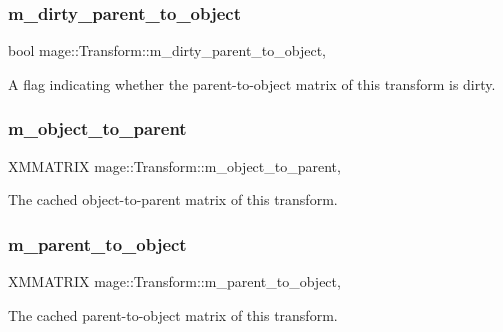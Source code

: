 \subsubsection{\texorpdfstring{m\+\_\+dirty\+\_\+parent\+\_\+to\+\_\+object}{m\_dirty\_parent\_to\_object}}
{\footnotesize\ttfamily bool mage\+::\+Transform\+::m\+\_\+dirty\+\_\+parent\+\_\+to\+\_\+object\hspace{0.3cm}{\ttfamily [mutable]}, {\ttfamily [private]}}

A flag indicating whether the parent-\/to-\/object matrix of this transform is dirty. \hypertarget{structmage_1_1_transform_ad21d0547b1648f22f6b28db044b1d4bd}{}\label{structmage_1_1_transform_ad21d0547b1648f22f6b28db044b1d4bd} 
\subsubsection{\texorpdfstring{m\+\_\+object\+\_\+to\+\_\+parent}{m\_object\_to\_parent}}
{\footnotesize\ttfamily X\+M\+M\+A\+T\+R\+IX mage\+::\+Transform\+::m\+\_\+object\+\_\+to\+\_\+parent\hspace{0.3cm}{\ttfamily [mutable]}, {\ttfamily [private]}}

The cached object-\/to-\/parent matrix of this transform. \hypertarget{structmage_1_1_transform_a4ca7fe2fe7ec7e09cda91e6af63f07f9}{}\label{structmage_1_1_transform_a4ca7fe2fe7ec7e09cda91e6af63f07f9} 
\subsubsection{\texorpdfstring{m\+\_\+parent\+\_\+to\+\_\+object}{m\_parent\_to\_object}}
{\footnotesize\ttfamily X\+M\+M\+A\+T\+R\+IX mage\+::\+Transform\+::m\+\_\+parent\+\_\+to\+\_\+object\hspace{0.3cm}{\ttfamily [mutable]}, {\ttfamily [private]}}

The cached parent-\/to-\/object matrix of this transform. \hypertarget{structmage_1_1_transform_a037b4fb338bfe79aa2ab1a2e809c40df}{}\label{structmage_1_1_transform_a037b4fb338bfe79aa2ab1a2e809c40df} 
